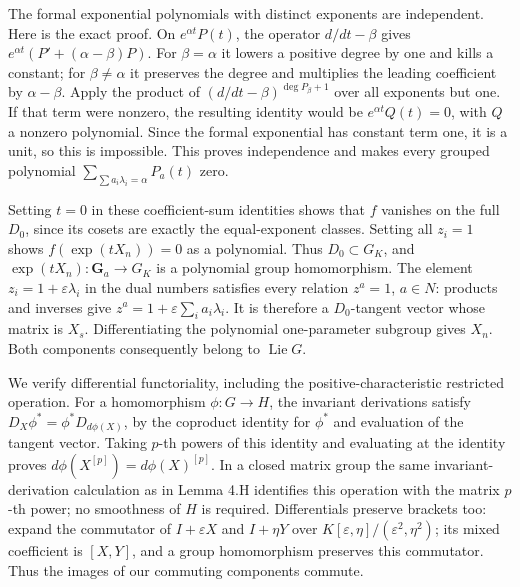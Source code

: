 \documentclass[11pt,a4paper,openany]{report}
\begin{document}
The formal exponential polynomials with distinct exponents are independent. Here is the exact proof. On \(e^{\alpha t}P(t)\), the operator \(d/dt-\beta\) gives \(e^{\alpha t}(P'+(\alpha-\beta)P)\). For \(\beta=\alpha\) it lowers a positive degree by one and kills a constant; for \(\beta\ne\alpha\) it preserves the degree and multiplies the leading coefficient by \(\alpha-\beta\). Apply the product of \((d/dt-\beta)^{\deg P_\beta+1}\) over all exponents but one. If that term were nonzero, the resulting identity would be \(e^{\alpha t}Q(t)=0\), with \(Q\) a nonzero polynomial. Since the formal exponential has constant term one, it is a unit, so this is impossible. This proves independence and makes every grouped polynomial \(\sum_{\sum a_i\lambda_i=\alpha}P_a(t)\) zero.

Setting \(t=0\) in these coefficient-sum identities shows that \(f\) vanishes on the full \(D_0\), since its cosets are exactly the equal-exponent classes. Setting all \(z_i=1\) shows \(f(\exp(tX_n))=0\) as a polynomial. Thus \(D_0\subset G_K\), and \(\exp(tX_n):\mathbf G_a\to G_K\) is a polynomial group homomorphism. The element \(z_i=1+\varepsilon\lambda_i\) in the dual numbers satisfies every relation \(z^a=1\), \(a\in N\): products and inverses give \(z^a=1+\varepsilon\sum_i a_i\lambda_i\). It is therefore a \(D_0\)-tangent vector whose matrix is \(X_s\). Differentiating the polynomial one-parameter subgroup gives \(X_n\). Both components consequently belong to \(\operatorname{Lie}G\).

We verify differential functoriality, including the positive-characteristic restricted operation. For a homomorphism \(\phi:G\to H\), the invariant derivations satisfy \(D_X\phi^*=\phi^*D_{d\phi(X)}\), by the coproduct identity for \(\phi^*\) and evaluation of the tangent vector. Taking \(p\)-th powers of this identity and evaluating at the identity proves \(d\phi(X^{[p]})=d\phi(X)^{[p]}\). In a closed matrix group the same invariant-derivation calculation as in Lemma 4.H identifies this operation with the matrix \(p\)-th power; no smoothness of \(H\) is required. Differentials preserve brackets too: expand the commutator of \(I+\varepsilon X\) and \(I+\eta Y\) over \(K[\varepsilon,\eta]/(\varepsilon^2,\eta^2)\); its mixed coefficient is \([X,Y]\), and a group homomorphism preserves this commutator. Thus the images of our commuting components commute.
\end{document}
